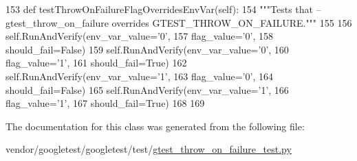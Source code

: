 \begin{DoxyCode}
153   \textcolor{keyword}{def }testThrowOnFailureFlagOverridesEnvVar(self):
154     \textcolor{stringliteral}{"""Tests that --gtest\_throw\_on\_failure overrides GTEST\_THROW\_ON\_FAILURE."""}
155 
156     self.RunAndVerify(env\_var\_value=\textcolor{stringliteral}{'0'},
157                       flag\_value=\textcolor{stringliteral}{'0'},
158                       should\_fail=\textcolor{keyword}{False})
159     self.RunAndVerify(env\_var\_value=\textcolor{stringliteral}{'0'},
160                       flag\_value=\textcolor{stringliteral}{'1'},
161                       should\_fail=\textcolor{keyword}{True})
162     self.RunAndVerify(env\_var\_value=\textcolor{stringliteral}{'1'},
163                       flag\_value=\textcolor{stringliteral}{'0'},
164                       should\_fail=\textcolor{keyword}{False})
165     self.RunAndVerify(env\_var\_value=\textcolor{stringliteral}{'1'},
166                       flag\_value=\textcolor{stringliteral}{'1'},
167                       should\_fail=\textcolor{keyword}{True})
168 
169 
\end{DoxyCode}


The documentation for this class was generated from the following file\+:\begin{DoxyCompactItemize}
\item 
vendor/googletest/googletest/test/\hyperlink{gtest__throw__on__failure__test_8py}{gtest\+\_\+throw\+\_\+on\+\_\+failure\+\_\+test.\+py}\end{DoxyCompactItemize}
